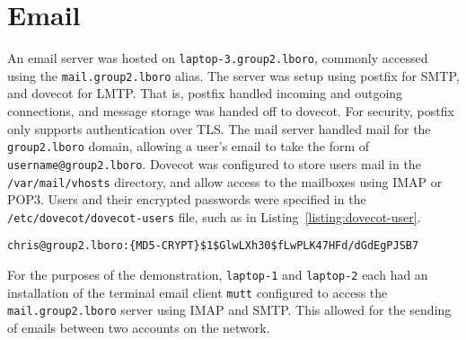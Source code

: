 \section{Email}
    An email server was hosted on \texttt{laptop-3.group2.lboro}, commonly
    accessed using the \texttt{mail.group2.lboro} alias. The server was setup
    using postfix for SMTP, and dovecot for LMTP. That is, postfix handled
    incoming and outgoing connections, and message storage was handed off to
    dovecot. For security, postfix only supports authentication over TLS. The
    mail server handled mail for the \texttt{group2.lboro} domain, allowing a
    user's email to take the form of \texttt{username@group2.lboro}. Dovecot was
    configured to store users mail in the \texttt{/var/mail/vhosts} directory,
    and allow access to the mailboxes using IMAP or POP3. Users and their
    encrypted passwords were specified in the \texttt{/etc/dovecot/dovecot-users}
    file, such as in Listing~\ref{listing:dovecot-user}.

    \begin{lstlisting}[caption={Dovecot user}, label={listing:dovecot-user}]
chris@group2.lboro:{MD5-CRYPT}$1$GlwLXh30$fLwPLK47HFd/dGdEgPJSB7
    \end{lstlisting}

    For the purposes of the demonstration, \texttt{laptop-1} and \texttt
    {laptop-2} each had an installation of the terminal email client \texttt
    {mutt} configured to access the \texttt{mail.group2.lboro} server using
    IMAP and SMTP. This allowed for the sending of emails between two accounts
    on the network.

